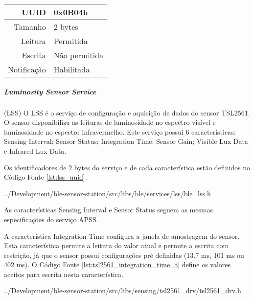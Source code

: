 \begin{tcolorbox}[arc=3mm,fontupper=\small,fonttitle=\bfseries,
subtitle style={boxrule=0.4pt, colback=white},colframe=green!25!black,
halign=center,bottom=0mm,
title=Temperature and Humidity Sensor Service]
\begin{tcbitemize}[raster columns=2,raster equal height,fontupper=\footnotesize,
	colbacktitle=yellow!100!red!100!black, coltitle=black,
	fonttitle=\footnotesize\bfseries,size=small, halign=center]
		\tcbitem [squeezed title={Humidity Data Characteristic}]
		\begin{tabular}{ r | l }
		UUID & 0x0B04h \\ \hline
		Tamanho & 2 bytes \\ \hline
		Leitura & Permitida \\ \hline
		Escrita & Não permitida \\ \hline
		Notificação & Habilitada 
		\end{tabular}		
	\end{tcbitemize}
	\tcblower
	\label{fig:resumo_thss}
\end{tcolorbox}

\newpage
\subparagraph{Luminosity Sensor Service}(LSS) 
\newline
O LSS é o serviço de configuração e aquisição de dados do sensor TSL2561. O
sensor disponibiliza as leituras de luminosidade no espectro visível e
luminosidade no espectro infravermelho. Este serviço possui 6 características:
Sensing Interval; Sensor Status; Integration Time; Sensor Gain; Visible Lux
Data e  Infrared Lux Data.

Os identificadores de 2 bytes do serviço e de cada característica estão
definidos no Código Fonte \ref{lst:lss_uuid}. 

\begin{minipage}{0.95\linewidth}

{../Development/ble-sensor-station/src/libs/ble/services/lss/ble_lss.h}
\end{minipage}

As características Sensing Interval e Sensor Status seguem as mesmas
especificações do serviço APSS.

A característica Integration Time configura a janela de amostragem do sensor.
Esta característica permite a leitura do valor atual e permite a escrita com
restrição, já que o sensor possui configurações pré definidas (13.7 ms, 101 ms
ou 402 ms). O Código Fonte \ref{lst:tsl2561_integration_time_t} define os
valores aceitos para escrita nesta característica. \cite{TSL2561Datasheet}

\begin{minipage}{0.95\linewidth}

{../Development/ble-sensor-station/src/libs/sensing/tsl2561_drv/tsl2561_drv.h}
\end{minipage}

